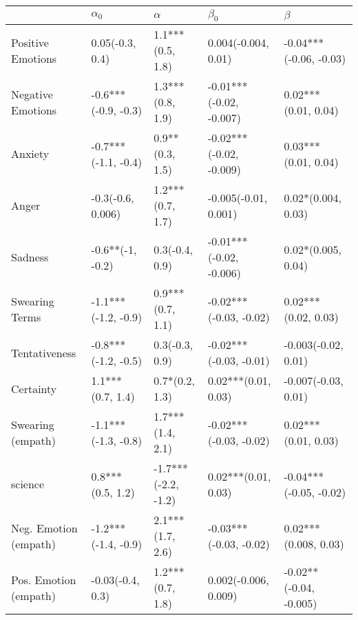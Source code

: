 \begin{tabular}{lllll}
\toprule
{} &           $\alpha_0$ &             $\alpha$ &                $\beta_0$ &                 $\beta$ \\
\midrule
Positive Emotions     &      0.05(-0.3, 0.4) &     1.1***(0.5, 1.8) &      0.004(-0.004, 0.01) &  -0.04***(-0.06, -0.03) \\
Negative Emotions     &  -0.6***(-0.9, -0.3) &     1.3***(0.8, 1.9) &  -0.01***(-0.02, -0.007) &     0.02***(0.01, 0.04) \\
Anxiety               &  -0.7***(-1.1, -0.4) &      0.9**(0.3, 1.5) &  -0.02***(-0.02, -0.009) &     0.03***(0.01, 0.04) \\
Anger                 &    -0.3(-0.6, 0.006) &     1.2***(0.7, 1.7) &     -0.005(-0.01, 0.001) &      0.02*(0.004, 0.03) \\
Sadness               &     -0.6**(-1, -0.2) &       0.3(-0.4, 0.9) &  -0.01***(-0.02, -0.006) &      0.02*(0.005, 0.04) \\
Swearing Terms        &  -1.1***(-1.2, -0.9) &     0.9***(0.7, 1.1) &   -0.02***(-0.03, -0.02) &     0.02***(0.02, 0.03) \\
Tentativeness         &  -0.8***(-1.2, -0.5) &       0.3(-0.3, 0.9) &   -0.02***(-0.03, -0.01) &     -0.003(-0.02, 0.01) \\
Certainty             &     1.1***(0.7, 1.4) &       0.7*(0.2, 1.3) &      0.02***(0.01, 0.03) &     -0.007(-0.03, 0.01) \\
Swearing (empath)     &  -1.1***(-1.3, -0.8) &     1.7***(1.4, 2.1) &   -0.02***(-0.03, -0.02) &     0.02***(0.01, 0.03) \\
science               &     0.8***(0.5, 1.2) &  -1.7***(-2.2, -1.2) &      0.02***(0.01, 0.03) &  -0.04***(-0.05, -0.02) \\
Neg. Emotion (empath) &  -1.2***(-1.4, -0.9) &     2.1***(1.7, 2.6) &   -0.03***(-0.03, -0.02) &    0.02***(0.008, 0.03) \\
Pos. Emotion (empath) &     -0.03(-0.4, 0.3) &     1.2***(0.7, 1.8) &     0.002(-0.006, 0.009) &  -0.02**(-0.04, -0.005) \\
\bottomrule
\end{tabular}
